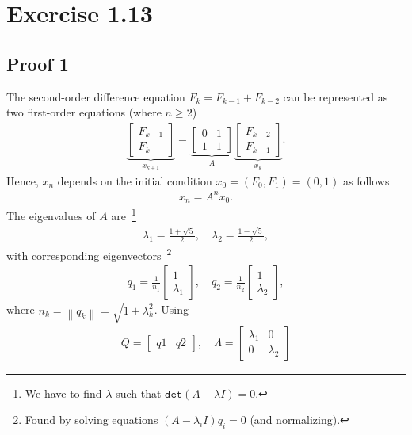 \documentclass[12pt,a4paper]{article}
\newcommand{\norm}[1]{\left\lVert#1\right\rVert}
\newcommand\cc[1]{\texttt{#1}}
\begin{document}
\section{Exercise 1.13}

\subsection{Proof 1}

The second-order difference equation $F_k = F_{k-1} + F_{k-2}$ can be represented as two
first-order equations (where $n \geq 2$)
\begin{align*}
  \underbrace{\begin{bmatrix} F_{k-1} \\ F_k \end{bmatrix}}_{x_{k+1}} =
  \underbrace{\begin{bmatrix} 0 & 1 \\ 1 & 1 \end{bmatrix}}_{A}
  \underbrace{\begin{bmatrix} F_{k-2} \\ F_{k-1} \end{bmatrix}}_{x_k}.
\end{align*}
Hence, $x_{n}$ depends on the initial condition $x_0 = (F_0, F_1) = (0, 1)$ as follows
\begin{align} \label{eq.initial-condition}
  x_n = A^nx_0.
\end{align}
The eigenvalues of $A$ are~\footnote{We have to find $\lambda$ such that $\cc{det}(A - \lambda I) = 0$.}
\begin{align*}
  \lambda_1 = \frac{1 + \sqrt{5}}{2}, \quad \lambda_2 = \frac{1 - \sqrt{5}}{2},
\end{align*}
with corresponding eigenvectors~\footnote{Found by solving equations $(A - \lambda_i
I)q_i = 0$ (and normalizing).}
\begin{align*}
  q_1 = \frac{1}{n_1}\begin{bmatrix} 1 \\ \lambda_1 \end{bmatrix}, \quad
  q_2 = \frac{1}{n_2}\begin{bmatrix} 1 \\ \lambda_2 \end{bmatrix},
\end{align*}
where $n_k = \norm{q_k} = \sqrt{1 + \lambda_k^2}$. Using
\begin{align*}
  Q = \begin{bmatrix}q1 & q2\end{bmatrix}, \quad
    \Lambda = \begin{bmatrix} \lambda_1 & 0 \\ 0 & \lambda_2 \end{bmatrix}
\end{align*}
\end{document}
